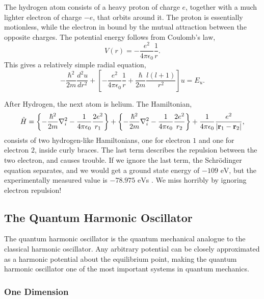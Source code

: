 The hydrogen atom consists of a heavy proton of charge $e$, together 
with a much lighter electron of charge $-e$, that orbits around it. The proton is 
essentially motionless, while the electron 
in bound by the mutual attraction between the opposite charges. The potential energy 
follows from Coulomb's law,
\begin{equation}
    V(r) = - \frac{e^2}{4\pi \epsilon_0}\frac{1}{r}.
\end{equation}
This gives a relatively simple radial equation,
\begin{equation}
    -\frac{\hbar^2}{2m}\frac{d^2u}{dr^2}
    + \left[
        - \frac{e^2}{4\pi\epsilon_0}\frac{1}{r} 
        + \frac{\hbar}{2m}\frac{l(l + 1)}{r^2}
    \right]
    u = E_u.
\end{equation}

After Hydrogen, the next atom is helium. The Hamiltonian,
\begin{equation}
    \hat{H} =
    \left\{
        -\frac{\hbar^2}{2m}\nabla^2_i
        -\frac{1}{4\pi\epsilon_0} \frac{2e^2}{r_1}
    \right\}
    +
    \left\{
        -\frac{\hbar^2}{2m}\nabla^2_i
        -\frac{1}{4\pi\epsilon_0} \frac{2e^2}{r_2}
    \right\}
    +
    \frac{1}{4\pi\epsilon_0}\frac{e^2}{|\vb{r}_1 - \vb{r}_2|},
\end{equation}
consists of two hydrogen-like Hamiltonians, one for electron $1$ and one for 
electron $2$, inside curly braces. The last term describes the repulsion between 
the two electron, and causes trouble. If we ignore the last term, the Schrödinger
equation separates, and we would get a ground state energy of $-109 \text{ eV}$,
but the experimentally measured value is
$-78.975 \text{ eV}$s \cite{griffiths2018introduction}. We miss horribly by 
ignoring electron repulsion!

\subsection{The Quantum Harmonic Oscillator}

The quantum harmonic oscillator is the quantum mechanical analogue to the 
classical harmonic oscillator. Any arbitrary potential can be closely 
approximated as a harmonic potential about the equilibrium point, making the 
quantum harmonic oscillator one of the most important systems in quantum mechanics.

\subsubsection{One Dimension}

